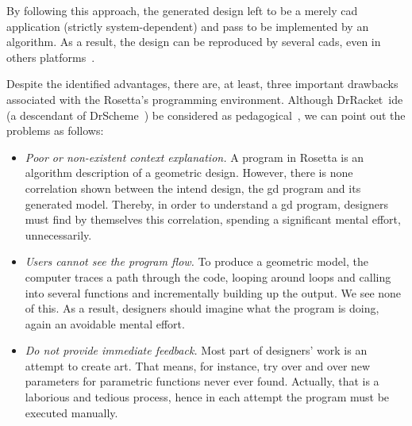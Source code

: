 By following this approach, the generated design left to be a merely \ac{cad} application (strictly system-dependent) and pass to be implemented by an algorithm. As a result, the design can be reproduced by several \ac{cad}s, even in others platforms~\cite{lopes2011portable}.

Despite the identified advantages, there are, at least, three important drawbacks associated with the Rosetta's programming environment. Although DrRacket~\ac{ide} (a descendant of DrScheme~\cite{findler2002drscheme}) be considered as pedagogical~\cite{findler2002drscheme}, we can point out the problems as follows:

\begin{itemize}
 \item \textit{Poor or non-existent context explanation.} A program in Rosetta is an algorithm description of a geometric design. However, there is none correlation shown between the intend design, the \ac{gd} program and its generated model. Thereby, in order to understand a \ac{gd} program, designers must find by themselves this correlation, spending a significant mental effort, unnecessarily. 
 
 \item \textit{Users cannot see the program flow.} To produce a geometric model, the computer traces a path through the code, looping around loops and calling into several functions and incrementally building up the output. We see none of this. As a result, designers should imagine what the program is doing, again an avoidable mental effort.
 
 \item \textit{Do not provide immediate feedback.} Most part of designers' work is an attempt to create art. That means, for instance, try over and over new parameters for parametric functions never ever found. Actually, that is a laborious and tedious process, hence in each attempt the program must be executed manually.
\end{itemize}





